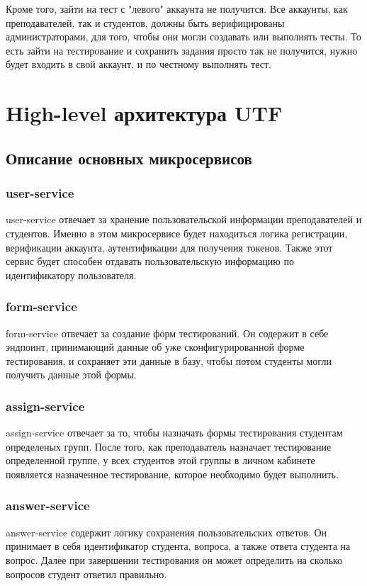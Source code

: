\documentclass[4paper,12pt]{article}
\begin{document}
	Кроме того, зайти на тест с "левого" аккаунта не получится. Все аккаунты, как преподавателей, так и студентов, должны быть верифицированы администраторами, для того, чтобы они могли создавать или выполнять тесты. То есть зайти на тестирование и сохранить задания просто так не получится, нужно будет входить в свой аккаунт, и по честному выполнять тест.
	
	\section{High-level архитектура UTF}
	\subsection{Описание основных микросервисов}
	\subsubsection{user-service}
	user-service отвечает за хранение пользовательской информации преподавателей и студентов. Именно в этом микросервисе будет находиться логика регистрации, верификации аккаунта, аутентификации для получения токенов. Также этот сервис будет способен отдавать пользовательскую информацию по идентификатору пользователя.
	
	\subsubsection{form-service}
	form-service отвечает за создание форм тестирований. Он содержит в себе эндпоинт, принимающий данные об уже сконфигурированной форме тестирования, и сохраняет эти данные в базу, чтобы потом студенты могли получить данные этой формы.
	
	\subsubsection{assign-service}
	assign-service отвечает за то, чтобы назначать формы тестирования студентам определеных групп. После того, как преподаватель назначает тестирование определенной группе, у всех студентов этой группы в личном кабинете появляется назначенное тестирование, которое необходимо будет выполнить.
	
	\subsubsection{answer-service}
	answer-service содержит логику сохранения пользовательских ответов. Он принимает в себя идентификатор студента, вопроса, а также ответа студента на вопрос. Далее при завершении тестирования он может определить на сколько вопросов студент ответил правильно.
	
\end{document}
